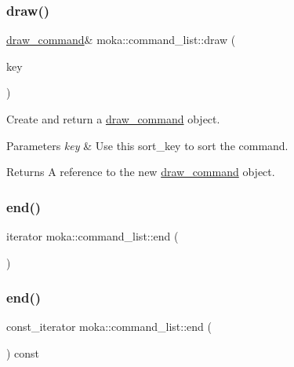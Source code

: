 \subsubsection{\texorpdfstring{draw()}{draw()}\hspace{0.1cm}{\footnotesize\ttfamily [2/2]}}
{\footnotesize\ttfamily \mbox{\hyperlink{classmoka_1_1draw__command}{draw\+\_\+command}}\& moka\+::command\+\_\+list\+::draw (\begin{DoxyParamCaption}\item[{\mbox{\hyperlink{namespacemoka_afa30a616e67b83113ebdb857555cf2bb}{sort\+\_\+key}}}]{key }\end{DoxyParamCaption})}



Create and return a \mbox{\hyperlink{classmoka_1_1draw__command}{draw\+\_\+command}} object. 


\begin{DoxyParams}{Parameters}
{\em key} & Use this sort\+\_\+key to sort the command. \\
\hline
\end{DoxyParams}
\begin{DoxyReturn}{Returns}
A reference to the new \mbox{\hyperlink{classmoka_1_1draw__command}{draw\+\_\+command}} object. 
\end{DoxyReturn}
\mbox{\label{classmoka_1_1command__list_af11bbf9fce1b2ae517fe63feeb9eca75}} 
\subsubsection{\texorpdfstring{end()}{end()}\hspace{0.1cm}{\footnotesize\ttfamily [1/2]}}
{\footnotesize\ttfamily iterator moka\+::command\+\_\+list\+::end (\begin{DoxyParamCaption}{ }\end{DoxyParamCaption})}

\mbox{\label{classmoka_1_1command__list_a69a582663d1027e600d1ca28cbe15a4d}} 
\subsubsection{\texorpdfstring{end()}{end()}\hspace{0.1cm}{\footnotesize\ttfamily [2/2]}}
{\footnotesize\ttfamily const\+\_\+iterator moka\+::command\+\_\+list\+::end (\begin{DoxyParamCaption}{ }\end{DoxyParamCaption}) const}


